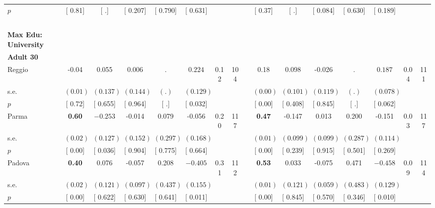 \begin{longtable}{L{8em} c c c c c c c p{1em} c c c c c c c}
\quad \quad \quad \quad $ p$ & [     0.81] & [        .] & [    0.207] & [    0.790] & [    0.631] & & & & [     0.37] & [        .] & [    0.084] & [    0.630] & [    0.189] & &  \\[1em]
~\\[1em]
\textbf{Max Edu: University} \\*
\quad \quad \textbf{Adult 30} & & & & & & & & & & & & & & & \\* 
\quad \quad \quad Reggio& -0.04 &     0.055 &     0.006 &         . & $ \mathbf{    0.224}$ &      0.12 &       104 & & 0.18 &     0.098 &    -0.026 &         . & $ \mathbf{    0.187}$ &      0.04 &       111  \\*
\quad \quad \quad \quad s.e.& $ (     0.01)$ & $ (    0.137)$ & $ (    0.144)$ & $ (        .)$ & $ (    0.129)$ & & & & $ (     0.00)$ & $ (    0.101)$ & $ (    0.119)$ & $ (        .)$ & $ (    0.078)$ & &  \\*
\quad \quad \quad \quad $ p$ & [     0.72] & [    0.655] & [    0.964] & [        .] & [    0.032] & & & & [     0.00] & [    0.408] & [    0.845] & [        .] & [    0.062] & &  \\[1em]
\quad \quad \quad Parma& \textbf{     0.60} & $ \mathbf{   -0.253}$ &    -0.014 &     0.079 &    -0.056 &      0.20 &       117 & & \textbf{     0.47} &    -0.147 &     0.013 &     0.200 &    -0.151 &      0.03 &       117  \\*
\quad \quad \quad \quad s.e.& $ (     0.02)$ & $ (    0.127)$ & $ (    0.152)$ & $ (    0.297)$ & $ (    0.168)$ & & & & $ (     0.01)$ & $ (    0.099)$ & $ (    0.099)$ & $ (    0.287)$ & $ (    0.114)$ & &  \\*
\quad \quad \quad \quad $ p$ & [     0.00] & [    0.036] & [    0.904] & [    0.775] & [    0.664] & & & & [     0.00] & [    0.239] & [    0.915] & [    0.501] & [    0.269] & &  \\[1em]
\quad \quad \quad Padova& \textbf{     0.40} &     0.076 &    -0.057 &     0.208 & $ \mathbf{   -0.405}$ &      0.31 &       112 & & \textbf{     0.53} &     0.033 &    -0.075 &     0.471 & $ \mathbf{   -0.458}$ &      0.09 &       114  \\*
\quad \quad \quad \quad s.e.& $ (     0.02)$ & $ (    0.121)$ & $ (    0.097)$ & $ (    0.437)$ & $ (    0.155)$ & & & & $ (     0.01)$ & $ (    0.121)$ & $ (    0.059)$ & $ (    0.483)$ & $ (    0.129)$ & &  \\*
\quad \quad \quad \quad $ p$ & [     0.00] & [    0.622] & [    0.630] & [    0.641] & [    0.011] & & & & [     0.00] & [    0.845] & [    0.570] & [    0.346] & [    0.010] & &  \\[1em]

\end{longtable}
